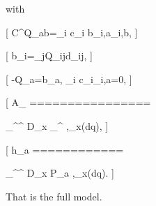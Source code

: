 with

[
C^Q_{ab}=\sum_i c_i b_{i,a}\chi_{i,b},
]

[
b_i=\sum_jQ_{ij}d_{ij},
]

[
-Q\chi_a=b_a,
\qquad
\sum_i c_i\chi_{i,a}=0,
]

[
A_{\alpha\gamma}
================

\int
\nabla\psi_\alpha^\perp{}^\top
D_x
\nabla\psi_\gamma^\perp
,\rho_x(\mathrm dq),
]

[
h_{\alpha a}
============

\int
\nabla\psi_\alpha^\perp{}^\top
D_x
\nabla P_a
,\rho_x(\mathrm dq).
]

That is the full model.
